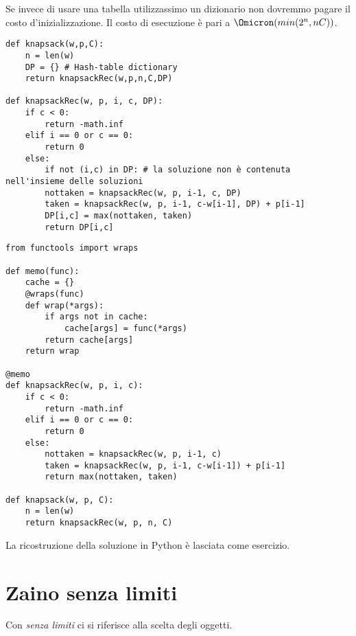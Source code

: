 Se invece di usare una tabella utilizzassimo un dizionario non dovremmo pagare il costo d'inizializzazione.
Il costo di esecuzione è pari a \(\Omicron(min(2^n, nC))\).

\begin{code}
\begin{verbatim}
def knapsack(w,p,C):
    n = len(w)
    DP = {} # Hash-table dictionary
    return knapsackRec(w,p,n,C,DP)

def knapsackRec(w, p, i, c, DP):
    if c < 0:
        return -math.inf
    elif i == 0 or c == 0:
        return 0
    else:
        if not (i,c) in DP: # la soluzione non è contenuta nell'insieme delle soluzioni
        nottaken = knapsackRec(w, p, i-1, c, DP)
        taken = knapsackRec(w, p, i-1, c-w[i-1], DP) + p[i-1]
        DP[i,c] = max(nottaken, taken)
        return DP[i,c]
\end{verbatim}
\end{code}

\begin{code}
\begin{verbatim}
from functools import wraps

def memo(func):
    cache = {}
    @wraps(func)
    def wrap(*args):
        if args not in cache:
            cache[args] = func(*args)
        return cache[args]
    return wrap

@memo
def knapsackRec(w, p, i, c):
    if c < 0:
        return -math.inf
    elif i == 0 or c == 0:
        return 0
    else:
        nottaken = knapsackRec(w, p, i-1, c)
        taken = knapsackRec(w, p, i-1, c-w[i-1]) + p[i-1]
        return max(nottaken, taken)

def knapsack(w, p, C):
    n = len(w)
    return knapsackRec(w, p, n, C)
\end{verbatim}
\end{code}

\begin{note}
La ricostruzione della soluzione in Python è lasciata come esercizio.
\end{note}

\section{Zaino senza limiti}

Con \emph{senza limiti} ci si riferisce alla scelta degli oggetti.

